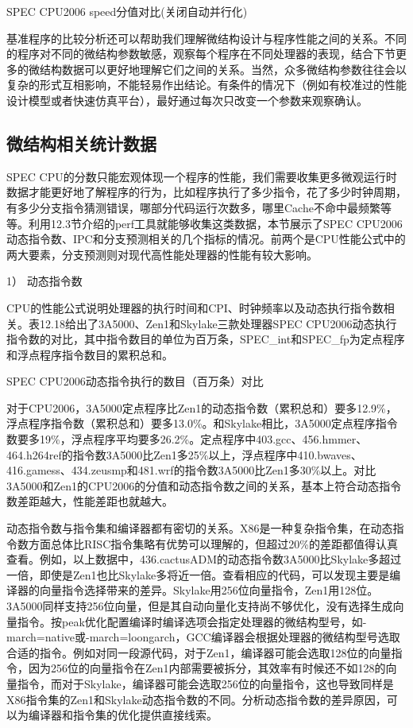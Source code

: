 \documentclass[]{ctexbook}
\begin{document}
\label{tab:2006speed-nopara}SPEC CPU2006 speed分值对比(关闭自动并行化)

基准程序的比较分析还可以帮助我们理解微结构设计与程序性能之间的关系。不同的程序对不同的微结构参数敏感，观察每个程序在不同处理器的表现，结合下节更多的微结构数据可以更好地理解它们之间的关系。当然，众多微结构参数往往会以复杂的形式互相影响，不能轻易作出结论。有条件的情况下（例如有校准过的性能设计模型或者快速仿真平台），最好通过每次只改变一个参数来观察确认。

\hypertarget{ux5faeux7ed3ux6784ux76f8ux5173ux7edfux8ba1ux6570ux636e}{%
\subsection{微结构相关统计数据}\label{ux5faeux7ed3ux6784ux76f8ux5173ux7edfux8ba1ux6570ux636e}}

SPEC CPU的分数只能宏观体现一个程序的性能，我们需要收集更多微观运行时数据才能更好地了解程序的行为，比如程序执行了多少指令，花了多少时钟周期，有多少分支指令猜测错误，哪部分代码运行次数多，哪里Cache不命中最频繁等等。利用12.3节介绍的perf工具就能够收集这类数据，本节展示了SPEC CPU2006动态指令数、IPC和分支预测相关的几个指标的情况。前两个是CPU性能公式中的两大要素，分支预测则对现代高性能处理器的性能有较大影响。

1） 动态指令数

CPU的性能公式说明处理器的执行时间和CPI、时钟频率以及动态执行指令数相关。表12.18给出了3A5000、Zen1和Skylake三款处理器SPEC CPU2006动态执行指令数的对比，其中指令数目的单位为百万条，SPEC\_int和SPEC\_fp为定点程序和浮点程序指令数目的累积总和。

\label{tab:2006insts}SPEC CPU2006动态指令执行的数目（百万条）对比

对于CPU2006，3A5000定点程序比Zen1的动态指令数（累积总和）要多12.9\%，浮点程序指令数（累积总和）要多13.0\%。和Skylake相比，3A5000定点程序指令数要多19\%，浮点程序平均要多26.2\%。定点程序中403.gcc、456.hmmer、464.h264ref的指令数3A5000比Zen1多25\%以上，浮点程序中410.bwaves、416.gamess、434.zeusmp和481.wrf的指令数3A5000比Zen1多30\%以上。对比3A5000和Zen1的CPU2006的分值和动态指令数之间的关系，基本上符合动态指令数差距越大，性能差距也就越大。

动态指令数与指令集和编译器都有密切的关系。X86是一种复杂指令集，在动态指令数方面总体比RISC指令集略有优势可以理解的，但超过20\%的差距都值得认真查看。例如，以上数据中，436.cactusADM的动态指令数3A5000比Skylake多超过一倍，即使是Zen1也比Skylake多将近一倍。查看相应的代码，可以发现主要是编译器的向量指令选择带来的差异。Skylake用256位向量指令，Zen1用128位。3A5000同样支持256位向量，但是其自动向量化支持尚不够优化，没有选择生成向量指令。按peak优化配置编译时编译选项会指定处理器的微结构型号，如-march=native或-march=loongarch，GCC编译器会根据处理器的微结构型号选取合适的指令。例如对同一段源代码，对于Zen1，编译器可能会选取128位的向量指令，因为256位的向量指令在Zen1内部需要被拆分，其效率有时候还不如128的向量指令，而对于Skylake，编译器可能会选取256位的向量指令，这也导致同样是X86指令集的Zen1和Skylake动态指令数的不同。分析动态指令数的差异原因，可以为编译器和指令集的优化提供直接线索。
\end{document}
